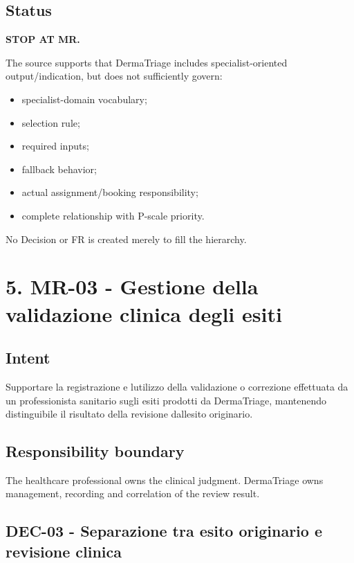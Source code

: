 \documentclass[11pt,a4paper]{article}
\providecommand{\tightlist}{\setlength{\itemsep}{0pt}\setlength{\parskip}{0pt}}
\begin{document}
\subsection{Status}\label{status}

\textbf{STOP AT MR.}

The source supports that DermaTriage includes specialist-oriented
output/indication, but does not sufficiently govern:

\begin{itemize}
\tightlist
\item
  specialist-domain vocabulary;
\item
  selection rule;
\item
  required inputs;
\item
  fallback behavior;
\item
  actual assignment/booking responsibility;
\item
  complete relationship with P-scale priority.
\end{itemize}

No Decision or FR is created merely to fill the hierarchy.

\section{5. MR-03 - Gestione della validazione clinica degli
esiti}\label{5-mr-03---gestione-della-validazione-clinica-degli-esiti}

\subsection{Intent}\label{intent-2}

Supportare la registrazione e l\textquotesingle utilizzo della
validazione o correzione effettuata da un professionista sanitario sugli
esiti prodotti da DermaTriage, mantenendo distinguibile il risultato
della revisione dall\textquotesingle esito originario.

\subsection{Responsibility boundary}\label{responsibility-boundary}

The healthcare professional owns the clinical judgment. DermaTriage owns
management, recording and correlation of the review result.

\subsection{DEC-03 - Separazione tra esito originario e revisione
clinica}\label{dec-03---separazione-tra-esito-originario-e-revisione-clinica}
\end{document}
